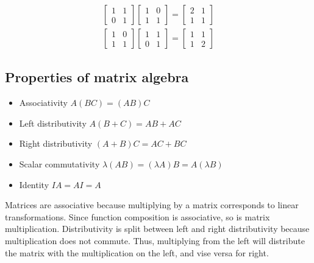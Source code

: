\documentclass{article}
\theoremstyle{mytheoremstyle}
\theoremstyle{mytheoremstyle}
\theoremstyle{myproblemstyle}
\begin{document}
    \begin{align*}
        \begin{bmatrix}
            1 & 1 \\
            0 & 1
        \end{bmatrix}
        \begin{bmatrix}
            1 & 0 \\
            1 & 1
        \end{bmatrix} = 
        \begin{bmatrix}
            2 & 1 \\
            1 & 1
        \end{bmatrix} \\
        \begin{bmatrix}
            1 & 0 \\
            1 & 1
        \end{bmatrix}
        \begin{bmatrix}
            1 & 1 \\
            0 & 1
        \end{bmatrix} = 
        \begin{bmatrix}
            1 & 1 \\
            1 & 2
        \end{bmatrix}
    \end{align*}

    \subsection*{Properties of matrix algebra}
    \begin{itemize}
        \item Associativity $A(BC) = (AB)C$
        \item Left distributivity $A(B+C) = AB+AC$
        \item Right distributivity $(A+B)C = AC+BC$
        \item Scalar commutativity $\lambda(AB) = (\lambda A)B = A(\lambda B)$
        \item Identity $IA = AI = A$
    \end{itemize}
    Matrices are associative because multiplying by a matrix corresponds to
    linear transformations. Since function composition is associative, so is
    matrix multiplication. Distributivity is split between left and right
    distributivity because multiplication does not commute. Thus, multiplying
    from the left will distribute the matrix with the multiplication on the
    left, and vise versa for right.
\end{document}

